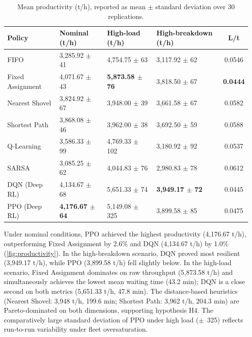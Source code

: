 \documentclass[11pt,a4paper]{article}
\begin{document}
\begin{table}[H]
\centering
\caption{Mean productivity (t/h), reported as mean $\pm$ standard deviation over 30 replications.}
\label{tab:productivity}
\footnotesize\setlength{\tabcolsep}{3pt}
\begin{tabularx}{\textwidth}{@{}lXXXc@{}}
\toprule
\textbf{Policy} & \textbf{Nominal (t/h)} & \textbf{High-load (t/h)} & \textbf{High-breakdown (t/h)} & \textbf{L/t} \\
\midrule
FIFO               & 3,285.92 $\pm$ 41 & 4,754.75 $\pm$ 63  & 3,117.92 $\pm$ 62 & 0.0546 \\
Fixed Assignment   & 4,071.67 $\pm$ 43 & \textbf{5,873.58 $\pm$ 76} & 3,818.50 $\pm$ 67 & \textbf{0.0444} \\
Nearest Shovel     & 3,824.92 $\pm$ 67 & 3,948.00 $\pm$ 39  & 3,661.58 $\pm$ 67 & 0.0582 \\
Shortest Path      & 3,868.08 $\pm$ 46 & 3,962.00 $\pm$ 38  & 3,692.50 $\pm$ 59 & 0.0588 \\
Q-Learning         & 3,586.33 $\pm$ 99 & 4,769.33 $\pm$ 102 & 3,180.92 $\pm$ 92 & 0.0537 \\
SARSA              & 3,085.25 $\pm$ 62 & 4,044.83 $\pm$ 76  & 2,980.83 $\pm$ 78 & 0.0612 \\
DQN (Deep RL)      & 4,134.67 $\pm$ 68 & 5,651.33 $\pm$ 74  & \textbf{3,949.17 $\pm$ 72} & 0.0445 \\
PPO (Deep RL)      & \textbf{4,176.67 $\pm$ 64} & 5,149.08 $\pm$ 325 & 3,899.58 $\pm$ 85 & 0.0475 \\
\bottomrule
\end{tabularx}
\end{table}

Under nominal conditions, PPO achieved the highest productivity (4,176.67 t/h), outperforming Fixed Assignment by 2.6\% and DQN (4,134.67 t/h) by 1.0\% (\cref{fig:productivity}). In the high-breakdown scenario, DQN proved most resilient (3,949.17 t/h), while PPO (3,899.58 t/h) fell slightly below. In the high-load scenario, Fixed Assignment dominates on raw throughput (5,873.58 t/h) and simultaneously achieves the lowest mean waiting time (43.2 min); DQN is a close second on both metrics (5,651.33 t/h, 47.8 min). The distance-based heuristics (Nearest Shovel: 3,948 t/h, 199.6 min; Shortest Path: 3,962 t/h, 204.3 min) are Pareto-dominated on both dimensions, supporting hypothesis H4. The comparatively large standard deviation of PPO under high load ($\pm$~325) reflects run-to-run variability under fleet oversaturation.
\end{document}
